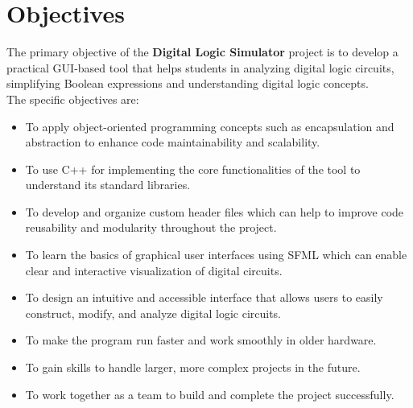 \section{Objectives}

The primary objective of the \textbf{Digital Logic Simulator} project is to develop a practical GUI-based tool that helps students in analyzing digital logic circuits, simplifying Boolean expressions and understanding digital logic concepts.\\
The specific objectives are:

\begin{itemize}
      \item To apply object-oriented programming concepts such as encapsulation and abstraction to enhance code maintainability and scalability.

      \item To use C++ for implementing the core functionalities of the tool to understand its standard libraries.

      \item To develop and organize custom header files which can help to improve code reusability and modularity throughout the project.

      \item To learn the basics of graphical user interfaces using SFML which can enable clear and interactive visualization of digital circuits.

      \item To design an intuitive and accessible interface that allows users to easily construct, modify, and analyze digital logic circuits.

      \item To make the program run faster and work smoothly in older hardware.

      \item To gain skills to handle larger, more complex projects in the future.

      \item To work together as a team to build and complete the project successfully.

\end{itemize}
\clearpage
